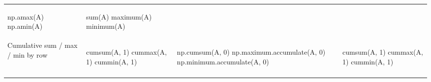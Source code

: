 \documentclass[10pt, landscape]{article}
\newenvironment{Shaded}{}{}
\newcommand{\DecValTok}[1]{\textcolor[rgb]{0.25,0.63,0.44}{{#1}}}
\newcommand{\FloatTok}[1]{\textcolor[rgb]{0.25,0.63,0.44}{{#1}}}
\newcommand{\NormalTok}[1]{{#1}}
\begin{document}
\begin{multicols*}{2}
\begin{tabular}[ ]{@{}llll@{}}
\begin{minipage}[t]{0.24\columnwidth}
\begin{Shaded}
\begin{Highlighting}[]
\NormalTok{np.amax(A)}
\NormalTok{np.amin(A)}
\end{Highlighting}
\end{Shaded}
\strut
\end{minipage} & \begin{minipage}[t]{0.20\columnwidth}\raggedright\strut
\begin{Shaded}
\begin{Highlighting}[]
\NormalTok{sum(A)}
\NormalTok{maximum(A)}
\NormalTok{minimum(A)}
\end{Highlighting}
\end{Shaded}
\strut
\end{minipage}\tabularnewline
\begin{minipage}[t]{0.23\columnwidth}\raggedright\strut
Cumulative sum / max / min by row\strut
\end{minipage} & \begin{minipage}[t]{0.22\columnwidth}\raggedright\strut
\begin{Shaded}
\begin{Highlighting}[]
\NormalTok{cumsum(A, }\FloatTok{1}\NormalTok{)}
\NormalTok{cummax(A, }\FloatTok{1}\NormalTok{)}
\NormalTok{cummin(A, }\FloatTok{1}\NormalTok{)}
\end{Highlighting}
\end{Shaded}
\strut
\end{minipage} & \begin{minipage}[t]{0.24\columnwidth}\raggedright\strut
\begin{Shaded}
\begin{Highlighting}[]
\NormalTok{np.cumsum(A, }\DecValTok{0}\NormalTok{)}
\NormalTok{np.maximum.accumulate(A, }\DecValTok{0}\NormalTok{)}
\NormalTok{np.minimum.accumulate(A, }\DecValTok{0}\NormalTok{)}
\end{Highlighting}
\end{Shaded}
\strut
\end{minipage} & \begin{minipage}[t]{0.20\columnwidth}\raggedright\strut
\begin{Shaded}
\begin{Highlighting}[]
\NormalTok{cumsum(A, }\FloatTok{1}\NormalTok{)}
\NormalTok{cummax(A, }\FloatTok{1}\NormalTok{)}
\NormalTok{cummin(A, }\FloatTok{1}\NormalTok{)}
\end{Highlighting}
\end{Shaded}
\strut
\end{minipage}\tabularnewline
\begin{minipage}[t]{0.23\columnwidth}\raggedright\strut

\end{minipage}
\end{tabular}
\end{multicols*}
\end{document}
